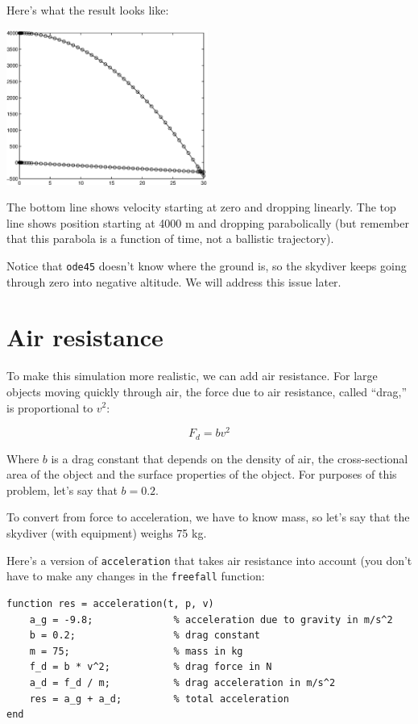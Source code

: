 \documentclass{book}
\begin{document}
Here's what the result looks like:

\beforefig \centerline{\includegraphics[height=2in]{figs/freefall.eps}}

The bottom line shows velocity starting at zero and dropping
linearly.  The top line shows position starting at 4000 m and
dropping parabolically (but remember that this parabola
is a function of time, not a ballistic trajectory).

Notice that {\tt ode45} doesn't know where the ground is, so the
skydiver keeps going through zero into negative altitude.  We will
address this issue later.


\section{Air resistance}

To make this simulation more realistic, we can add air resistance.
For large objects moving quickly through air, the force due to air
resistance, called ``drag,'' is proportional to $v^2$:

\[ F_{d} = b v^2 \]

Where $b$ is a drag constant that depends on the density of
air, the cross-sectional area of the object and
the surface properties of the object.  For purposes of this
problem, let's say that $b = 0.2$.

To convert from force to acceleration, we have to know mass, so let's
say that the skydiver (with equipment) weighs 75 kg.

Here's a version of {\tt acceleration} that takes air resistance
into account (you don't have to make any changes in the {\tt freefall} function:

\begin{verbatim}
function res = acceleration(t, p, v)
    a_g = -9.8;              % acceleration due to gravity in m/s^2
    b = 0.2;                 % drag constant
    m = 75;                  % mass in kg
    f_d = b * v^2;           % drag force in N
    a_d = f_d / m;           % drag acceleration in m/s^2
    res = a_g + a_d;         % total acceleration
end
\end{verbatim}
\end{document}
